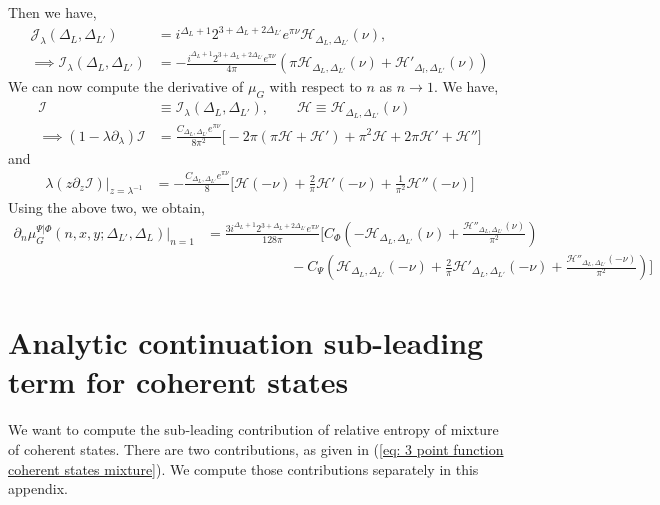 \documentclass[11pt]{article}
\newcommand{\p}{\partial}
\newcommand{\nn}{\nonumber}
\newcommand{\lb}{\left(}
\newcommand{\rb}{\right)}
\begin{document}
Then we have,
\begin{align}
    \mathcal{J}_\lambda(\Delta_L,\Delta_{L'}) &= i^{\Delta_L+1}2^{3+\Delta_L+2\Delta_{L'}}e^{\pi \nu}\mathcal{H}_{\Delta_L,\Delta_{L'}}(\nu),
    \\
    \implies \mathcal{I}_\lambda(\Delta_L,\Delta_{L'})&= -\frac{i^{\Delta_L+1}2^{3+\Delta_L+2\Delta_{L'}}e^{\pi \nu}}{4\pi}\lb \pi \mathcal{H}_{\Delta_L,\Delta_{L'}}(\nu)+ \mathcal{H}'_{\Delta_l,\Delta_{L'}}(\nu)\rb
\end{align}
We can now compute the derivative of $\mu_G$ with respect to $n$ as $n\to 1$. We have,
\begin{align}
    \mathcal{I}&\equiv \mathcal{I}_\lambda(\Delta_L,\Delta_{L'}) ,\qquad \mathcal{H}\equiv \mathcal{H}_{\Delta_L,\Delta_{L'}}(\nu)
    \\
    \implies (1-\lambda\p_\lambda)\mathcal{I} &= \frac{C_{\Delta_L,\Delta_{L'}}e^{\pi\nu}}{8\pi^2}\big[ -2\pi \lb \pi \mathcal{H} + \mathcal{H}'\rb +\pi^2\mathcal{H} + 2\pi \mathcal{H}' + \mathcal{H}'' \big]
\end{align}
and
\begin{align}
    \lambda(z\p_z \mathcal{I})|_{z=\lambda^{-1}} &= -\frac{C_{\Delta_L,\Delta_{L'}}e^{\pi\nu}}{8} \big[ \mathcal{H}(-\nu) + \frac{2}{\pi}\mathcal{H}'(-\nu) + \frac{1}{\pi^2}\mathcal{H}''(-\nu)\big]
\end{align}
Using the above two, we obtain,
\begin{align}\label{eq: analytic continuation of muG three point large x mixture}
    \p_n\mu_G^{\Psi|\Phi} (n,x,y;\Delta_{L'},\Delta_L)|_{n=1} &= \frac{3i^{\Delta_L+1}2^{3+\Delta_L+2\Delta_{L'}}e^{\pi \nu}}{128\pi} \Bigg[ C_\Phi \lb -\mathcal{H}_{\Delta_L,\Delta_{L'}}(\nu) + \frac{\mathcal{H}''_{\Delta_L,\Delta_{L'}}(\nu)}{\pi^2} \rb \nn \\
    &\qquad\qquad\qquad- C_\Psi \lb \mathcal{H}_{\Delta_L,\Delta_{L'}}(-\nu) + \frac{2}{\pi}\mathcal{H}'_{\Delta_L,\Delta_{L'}}(-\nu)+\frac{\mathcal{H}''_{\Delta_L,\Delta_{L'}}(-\nu)}{\pi^2}\rb\Bigg]
\end{align}
\section{Analytic continuation sub-leading term for coherent states}\label{appendix: sub leading term for coherent states}
We want to compute the sub-leading contribution of relative entropy of mixture of coherent states. There are two contributions, as given in (\ref{eq: 3 point function coherent states mixture}). We compute those contributions separately in this appendix. 
\end{document}
